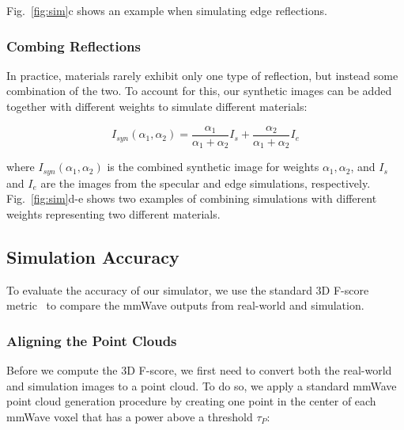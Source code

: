 \noindent Fig.~\ref{fig:sim}c shows an example when simulating edge reflections.

\vspace{-0.1pt}
\subsubsection{Combing Reflections}
\vspace{-0.1pt}
In practice, materials rarely exhibit only one type of reflection, but instead some combination of the two. To account for this, our synthetic images can be added together with different weights to simulate different materials:


\vspace{-0.1pt}
{ \eqsize
\begin{equation}
    I_{syn}(\alpha_1, \alpha_2) = \frac{\alpha_1}{\alpha_1 + \alpha_2} I_s + \frac{\alpha_2}{\alpha_1 + \alpha_2} I_e
\end{equation}}

\noindent where $I_{syn}(\alpha_1, \alpha_2)$ is the combined synthetic image for weights $\alpha_1, \alpha_2$, and $I_s$ and $I_e$ are the images from the specular and edge simulations, respectively.
Fig.~\ref{fig:sim}d-e shows two examples of combining simulations with different weights representing two different materials. 



\vspace{-0.5pt}
\subsection{Simulation Accuracy}
\vspace{-0.1pt}
To evaluate the accuracy of our simulator, we use the standard 3D F-score metric~\cite{3d_fscore} to compare the mmWave outputs from real-world and simulation. 

\vspace{-0.1pt}
\subsubsection{Aligning the Point Clouds}
\vspace{-0.1pt}

Before we compute the 3D F-score, we first need to convert both the real-world and simulation images to a point cloud. To do so, we apply a standard mmWave point cloud generation procedure\cite{LauraEPFL} by
creating one point in the center of each mmWave voxel that has a power above a threshold $\tau_P$: 

